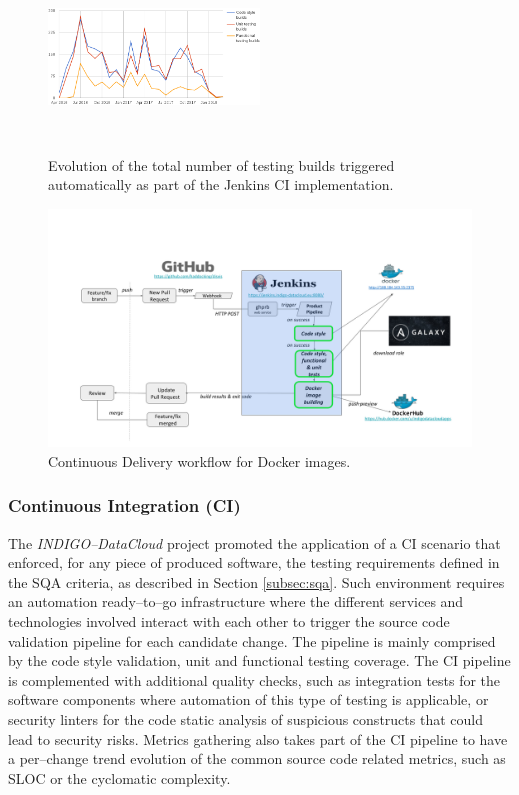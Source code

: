 \documentclass[journal]{IEEEtran}
\begin{document}
\begin{figure}[ht]
\centering
\includegraphics[width=0.5\textwidth, height=50mm]{images/jenkins_CI_builds.png}
\caption{Evolution of the total number of testing builds triggered automatically as part of the Jenkins CI implementation.}
\label{fig:fig_jenkins_CI_builds}
\end{figure}

\begin{figure}[ht]
\centering
\includegraphics[width=\textwidth]{images/devops.png}
\caption{Continuous Delivery workflow for Docker images.}
\label{fig:fig_CD}
\end{figure}


\subsubsection{Continuous Integration (CI)}
\label{subsec:ci}

The {\sl INDIGO--DataCloud} project promoted the application of a CI scenario that enforced,
for any piece of produced software, the testing requirements defined in the SQA criteria,
as described in Section \ref{subsec:sqa}. Such environment requires an automation
ready--to--go infrastructure where the different services and technologies involved interact with each
other to trigger the source code validation pipeline for each candidate change. The
pipeline is mainly comprised by the code style validation, unit and functional testing
coverage. The CI pipeline is complemented with additional quality checks, such as
integration tests for the software components where automation of this type of testing
is applicable, or security linters for the code static analysis of suspicious
constructs that could lead to security risks. Metrics gathering also takes part of
the CI pipeline to have a per--change trend evolution of the common source code
related metrics, such as SLOC or the cyclomatic complexity.
\end{document}
